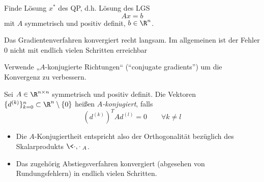 \documentclass[11pt]{scrartcl}
\begin{document}
Finde Lösung $x^*$ des QP, d.h. Lösung des LGS
\[
	Ax = b
\]
mit $A$ symmetrisch und positiv definit, $b \in \R^n$.

Das Gradientenverfahren konvergiert recht langsam.
Im allgemeinen ist der Fehler $0$ nicht mit endlich vielen Schritten erreichbar

Verwende „$A$-konjugierte Richtungen“ (“conjugate gradients”) um die Konvergenz zu verbessern.

\begin{df} \label{4.16}
	Sei $A \in \R^{n\times n}$ symmetrisch und positiv definit.
	Die Vektoren $\{d^{(k)}\}_{k=0}^n \subset \R^n \setminus \{0\}$ heißen \emph{$A$-konjugiert}, falls
	\[
		(d^{(k)})^T A d^{(l)} = 0
		\qquad 
		\forall k \neq l
	\]
	\begin{note}
		\begin{itemize}
			\item
				Die $A$-Konjugiertheit entspricht also der Orthogonalität bezüglich des Skalarprodukts $\<\cdot, \cdot\>_A$.
			\item
				Das zugehörig Abstiegsverfahren konvergiert (abgesehen von Rundungsfehlern) in endlich vielen Schritten.

		\end{itemize}
	\end{note}
\end{df}
\end{document}
